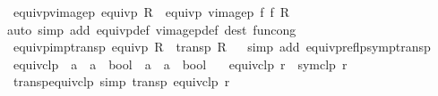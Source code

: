 \begin{isabellebody}
\isanewline
{}\isamarkupfalse%
\ equivp{\isacharunderscore}{\kern0pt}vimage{}p{\isacharcolon}{\kern0pt}\ {\isachardoublequoteopen}equivp\ R\ {\isasymLongrightarrow}\ equivp\ {\isacharparenleft}{\kern0pt}vimage{}p\ f\ f\ R{\isacharparenright}{\kern0pt}{\isachardoublequoteclose}\isanewline
%
\isadelimproof
\ \ %
\endisadelimproof
%
\isatagproof
{}\isamarkupfalse%
{\isacharparenleft}{\kern0pt}auto\ simp\ add{\isacharcolon}{\kern0pt}\ equivp{\isacharunderscore}{\kern0pt}def\ vimage{}p{\isacharunderscore}{\kern0pt}def\ dest{\isacharcolon}{\kern0pt}\ fun{\isacharunderscore}{\kern0pt}cong{\isacharparenright}{\kern0pt}%
\endisatagproof
{\isafoldproof}%
%
\isadelimproof
\isanewline
%
\endisadelimproof
\isanewline
{}\isamarkupfalse%
\ equivp{\isacharunderscore}{\kern0pt}imp{\isacharunderscore}{\kern0pt}transp{\isacharcolon}{\kern0pt}\ {\isachardoublequoteopen}equivp\ R\ {\isasymLongrightarrow}\ transp\ R{\isachardoublequoteclose}\isanewline
%
\isadelimproof
\ \ %
\endisadelimproof
%
\isatagproof
{}\isamarkupfalse%
{\isacharparenleft}{\kern0pt}simp\ add{\isacharcolon}{\kern0pt}\ equivp{\isacharunderscore}{\kern0pt}reflp{\isacharunderscore}{\kern0pt}symp{\isacharunderscore}{\kern0pt}transp{\isacharparenright}{\kern0pt}%
\endisatagproof
{\isafoldproof}%
%
\isadelimproof
%
\endisadelimproof
%
\isadelimdocument
%
\endisadelimdocument
%
\isatagdocument
%
\isamarkuptrue%
%
\endisatagdocument
{\isafolddocument}%
%
\isadelimdocument
%
\endisadelimdocument
{}\isamarkupfalse%
\ equivclp\ {\isacharcolon}{\kern0pt}{\isacharcolon}{\kern0pt}\ {\isachardoublequoteopen}{\isacharparenleft}{\kern0pt}{\isacharprime}{\kern0pt}a\ {\isasymRightarrow}\ {\isacharprime}{\kern0pt}a\ {\isasymRightarrow}\ bool{\isacharparenright}{\kern0pt}\ {\isasymRightarrow}\ {\isacharprime}{\kern0pt}a\ {\isasymRightarrow}\ {\isacharprime}{\kern0pt}a\ {\isasymRightarrow}\ bool{\isachardoublequoteclose}\ \isanewline
\ \ {\isachardoublequoteopen}equivclp\ r\ {\isacharequal}{\kern0pt}\ {\isacharparenleft}{\kern0pt}symclp\ r{\isacharparenright}{\kern0pt}\isactrlsup {\isacharasterisk}{\kern0pt}\isactrlsup {\isacharasterisk}{\kern0pt}{\isachardoublequoteclose}\isanewline
\isanewline
{}\isamarkupfalse%
\ transp{\isacharunderscore}{\kern0pt}equivclp\ {\isacharbrackleft}{\kern0pt}simp{\isacharbrackright}{\kern0pt}{\isacharcolon}{\kern0pt}\ {\isachardoublequoteopen}transp\ {\isacharparenleft}{\kern0pt}equivclp\ r{\isacharparenright}{\kern0pt}{\isachardoublequoteclose}\isanewline

\end{isabellebody}

